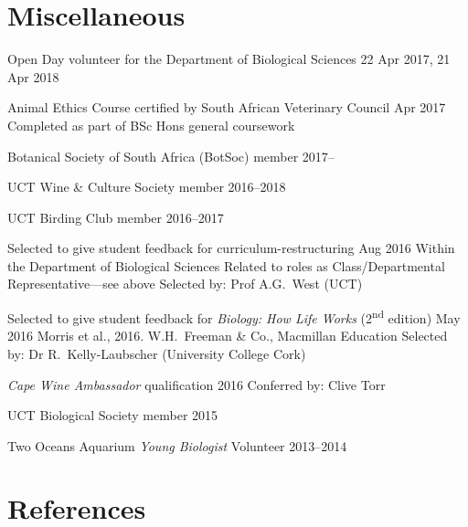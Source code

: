 \documentclass[10pt]{article}
\begin{document}
\clearpage %

\section*{Miscellaneous} %

\begin{hangparas}{2em}{1}

Open Day volunteer for the Department of Biological Sciences
                                                 \hfill 22 Apr 2017, 21 Apr 2018

Animal Ethics Course certified by South African Veterinary Council
                                                          \hfill Apr 2017 \break
Completed as part of BSc Hons general coursework

Botanical Society of South Africa (BotSoc) member                  \hfill 2017--

UCT Wine \& Culture Society member                             \hfill 2016--2018

UCT Birding Club member                                        \hfill 2016--2017

Selected to give student feedback for curriculum-restructuring
                                                          \hfill Aug 2016 \break
Within the Department of Biological Sciences                              \break
Related to roles as Class/Departmental Representative---see above         \break
Selected by: Prof A.G.~West (UCT)

Selected to give student feedback for \textit{Biology: How Life Works}
(2\textsuperscript{nd} edition)                           \hfill May 2016 \break
Morris et al., 2016. W.H.~Freeman \& Co., Macmillan Education             \break
Selected by: Dr R.~Kelly-Laubscher (University College Cork)

\textit{Cape Wine Ambassador} qualification                   \hfill 2016 \break
Conferred by: Clive Torr

UCT Biological Society member                                        \hfill 2015

Two Oceans Aquarium \textit{Young Biologist} Volunteer         \hfill 2013--2014

\hfill

\end{hangparas}

\section*{References} %
\end{document}
